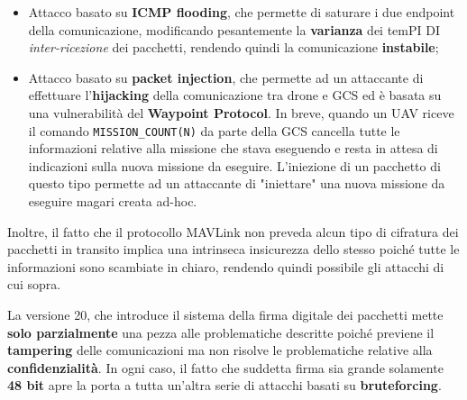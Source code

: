 \documentclass[a4paper, 12pt, oneside]{article}
\begin{document}
\begin{itemize}
    \item Attacco basato su \textbf{ICMP flooding}, che permette di saturare i due endpoint della comunicazione, modificando pesantemente la \textbf{varianza} dei temPI DI \textit{inter-ricezione} dei pacchetti, rendendo quindi la comunicazione \textbf{instabile};
    \item Attacco basato su \textbf{packet injection}, che permette ad un attaccante di effettuare l'\textbf{hijacking} della comunicazione tra drone e GCS ed è basata su una vulnerabilità del \textbf{Waypoint Protocol}. In breve, quando un UAV riceve il comando \texttt{MISSION\_COUNT(N)} da parte della GCS cancella tutte le informazioni relative alla missione che stava eseguendo e resta in attesa di indicazioni sulla nuova missione da eseguire. L'iniezione di un pacchetto di questo tipo permette ad un attaccante di "iniettare" una nuova missione da eseguire magari creata ad-hoc.
\end{itemize}

Inoltre, il fatto che il protocollo MAVLink non preveda alcun tipo di cifratura dei pacchetti in transito implica una intrinseca insicurezza dello stesso poiché tutte le informazioni sono scambiate in chiaro, rendendo quindi possibile gli attacchi di cui sopra.

La versione 20, che introduce il sistema della firma digitale dei pacchetti mette \textbf{solo parzialmente} una pezza alle problematiche descritte poiché previene il \textbf{tampering} delle comunicazioni ma non risolve le problematiche relative alla \textbf{confidenzialità}. In ogni caso, il fatto che suddetta firma sia grande solamente \textbf{48 bit} apre la porta a tutta un'altra serie di attacchi basati su \textbf{bruteforcing}.

\newpage
\printbibliography[title={Riferimenti bibliografici e risorse consultate}]
\end{document}
